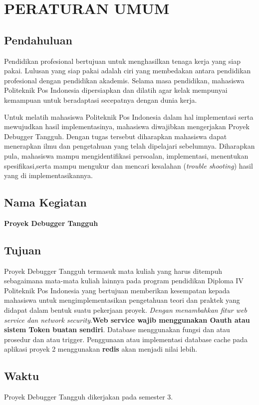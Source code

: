 \chapter{PERATURAN UMUM}
\section{Pendahuluan}
Pendidikan profesional bertujuan untuk menghasilkan tenaga kerja yang siap pakai. Lulusan yang siap pakai adalah ciri yang membedakan antara pendidikan profesional dengan pendidikan akademis. Selama masa pendidikan, mahasiswa Politeknik Pos Indonesia dipersiapkan dan dilatih agar kelak mempunyai kemampuan untuk beradaptasi secepatnya dengan dunia kerja.

Untuk melatih mahasiswa Politeknik Pos Indonesia dalam hal implementasi serta mewujudkan hasil implementasinya, mahasiswa diwajibkan mengerjakan  Proyek	Debugger Tangguh. Dengan tugas tersebut diharapkan mahasiswa dapat menerapkan ilmu dan pengetahuan yang telah dipelajari sebelumnya. Diharapkan pula, mahasiswa mampu mengidentifikasi persoalan, implementasi, menentukan spesifikasi,serta mampu mengukur dan mencari kesalahan (\textit{trouble shooting}) hasil yang di implementasikannya.

\section{Nama Kegiatan}
\textbf{Proyek	Debugger Tangguh }

\section{Tujuan}
Proyek	Debugger Tangguh termasuk mata kuliah yang harus ditempuh sebagaimana mata-mata kuliah lainnya pada program pendidikan Diploma IV Politeknik Pos Indonesia yang bertujuan memberikan kesempatan kepada mahasiswa untuk mengimplementasikan pengetahuan teori dan praktek yang didapat dalam bentuk suatu pekerjaan proyek.\textit{ Dengan menambahkan fitur web service dan network security}.\textbf{Web service wajib menggunakan Oauth atau sistem Token buatan sendiri}. Database menggunakan fungsi dan atau prosedur dan atau trigger. Penggunaan atau implementasi database cache pada aplikasi proyek 2 menggunakan \textbf{redis} akan menjadi nilai lebih.

\section{Waktu}
Proyek	Debugger Tangguh  dikerjakan pada semester 3.

